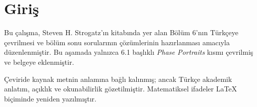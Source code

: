 \chapter*{Giriş}
{}

\begin{justify}
Bu çalışma, Steven H. Strogatz'ın kitabında yer alan Bölüm 6'nın Türkçeye çevrilmesi ve bölüm sonu sorularının çözümlerinin hazırlanması amacıyla düzenlenmiştir. Bu aşamada yalnızca 6.1 başlıklı \textit{Phase Portraits} kısmı çevrilmiş ve belgeye eklenmiştir.

Çeviride kaynak metnin anlamına bağlı kalınmış; ancak Türkçe akademik anlatım, açıklık ve okunabilirlik gözetilmiştir. Matematiksel ifadeler LaTeX biçiminde yeniden yazılmıştır.
\end{justify}

\newpage
